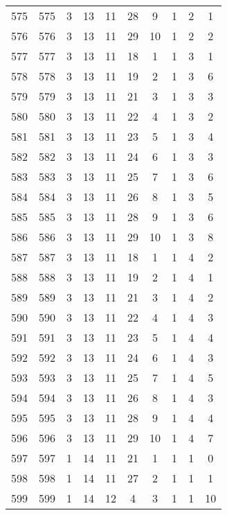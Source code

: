 \begin{longtable}{cccccccccc}
  575 & 575 &   3 &  13 &  11 &  28 &   9 &   1 &   2 &   1 \\ 
  576 & 576 &   3 &  13 &  11 &  29 &  10 &   1 &   2 &   2 \\ 
  577 & 577 &   3 &  13 &  11 &  18 &   1 &   1 &   3 &   1 \\ 
  578 & 578 &   3 &  13 &  11 &  19 &   2 &   1 &   3 &   6 \\ 
  579 & 579 &   3 &  13 &  11 &  21 &   3 &   1 &   3 &   3 \\ 
  580 & 580 &   3 &  13 &  11 &  22 &   4 &   1 &   3 &   2 \\ 
  581 & 581 &   3 &  13 &  11 &  23 &   5 &   1 &   3 &   4 \\ 
  582 & 582 &   3 &  13 &  11 &  24 &   6 &   1 &   3 &   3 \\ 
  583 & 583 &   3 &  13 &  11 &  25 &   7 &   1 &   3 &   6 \\ 
  584 & 584 &   3 &  13 &  11 &  26 &   8 &   1 &   3 &   5 \\ 
  585 & 585 &   3 &  13 &  11 &  28 &   9 &   1 &   3 &   6 \\ 
  586 & 586 &   3 &  13 &  11 &  29 &  10 &   1 &   3 &   8 \\ 
  587 & 587 &   3 &  13 &  11 &  18 &   1 &   1 &   4 &   2 \\ 
  588 & 588 &   3 &  13 &  11 &  19 &   2 &   1 &   4 &   1 \\ 
  589 & 589 &   3 &  13 &  11 &  21 &   3 &   1 &   4 &   2 \\ 
  590 & 590 &   3 &  13 &  11 &  22 &   4 &   1 &   4 &   3 \\ 
  591 & 591 &   3 &  13 &  11 &  23 &   5 &   1 &   4 &   4 \\ 
  592 & 592 &   3 &  13 &  11 &  24 &   6 &   1 &   4 &   3 \\ 
  593 & 593 &   3 &  13 &  11 &  25 &   7 &   1 &   4 &   5 \\ 
  594 & 594 &   3 &  13 &  11 &  26 &   8 &   1 &   4 &   3 \\ 
  595 & 595 &   3 &  13 &  11 &  28 &   9 &   1 &   4 &   4 \\ 
  596 & 596 &   3 &  13 &  11 &  29 &  10 &   1 &   4 &   7 \\ 
  597 & 597 &   1 &  14 &  11 &  21 &   1 &   1 &   1 &   0 \\ 
  598 & 598 &   1 &  14 &  11 &  27 &   2 &   1 &   1 &   1 \\ 
  599 & 599 &   1 &  14 &  12 &   4 &   3 &   1 &   1 &  10 \\ 

\end{longtable}
